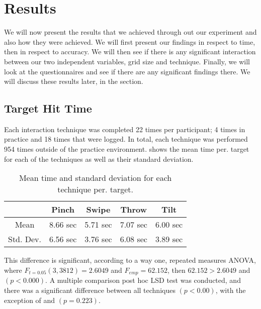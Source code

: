 \section{Results}
We will now present the results that we achieved through out our experiment and also how they were achieved. We will first present our findings in respect to time, then in respect to accuracy. We will then see if there is any significant interaction between our two independent variables, grid size and technique. Finally, we will look at the questionnaires and see if there are any significant findings there. We will discuss these results later, in the  section.  

\subsection{Target Hit Time}

Each interaction technique was completed 22 times per participant; 4 times in practice and 18 times that were logged. In total, each technique was performed 954 times outside of the practice environment.  shows the mean time per. target for each of the techniques as well as their standard deviation. 
\begin{table}[H]
	\centering
	\begin{tabular}{|c|c|c|c|c|}
		\hline
		\rowcolor[HTML]{9B9B9B} 
		 & \textbf{Pinch} & \textbf{Swipe} & \textbf{Throw} & \textbf{Tilt} \\ \hline
		Mean & 8.66  sec         & 5.71 sec          & 7.07 sec          & 6.00 sec         \\ \hline
		Std. Dev. & 6.56 sec & 3.76 sec & 6.08 sec & 3.89 sec \\ \hline
	\end{tabular}
	\caption{Mean time and standard deviation for each technique per. target.}
	\label{tab:meanTimesTechnique}
\end{table}

This difference is significant, according to a way one, repeated measures ANOVA, where $F_{t=0.05}(3,3812)= 2.6049$ and $F_{emp}=62.152$, then $62.152 > 2.6049$ and $(p<0.000)$. A multiple comparison post hoc LSD test was conducted, and there was a significant difference between all techniques $(p<0.00)$, with the exception of \swipe and \tilt $(p=0.223)$. 

